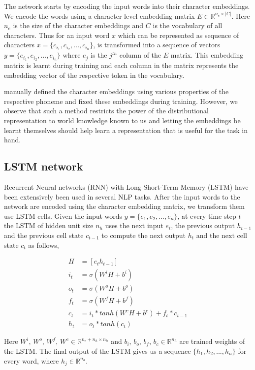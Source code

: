\documentclass[11pt,letterpaper]{article}
\begin{document}
The network starts by encoding the input words into their character embeddings. We encode the words using a character level embedding matrix $E \in \mathbb{R}^{n_e \times |C|}$. Here $n_e$ is the size of the character embeddings and $C$ is the vocabulary of all characters. Thus for an input word $x$ which can be represented as sequence of characters $x = \{c_{i_1}, c_{i_2}, ..., c_{i_n}\}$, is transformed into a sequence of vectors $y = \{e_{i_1}, e_{i_2}, ..., e_{i_n}\}$ where $e_j$ is the $j^{th}$ column of the $E$ matrix. This embedding matrix is learnt during training and each column in the matrix represents the embedding vector of the respective token in the vocabulary. 

\citet{rama2016siamese} manually defined the character embeddings using various properties of the respective phoneme and fixed these embeddings during training. However, we observe that such a method restricts the power of the distributional representation to world knowledge known to us and letting the embeddings be learnt themselves should help learn a representation that is useful for the task in hand.

\subsection{LSTM network}

Recurrent Neural networks (RNN) with Long Short-Term Memory (LSTM) have been extensively been used in several NLP tasks. After the input words to the network are encoded using the character embedding matrix, we transform them use LSTM cells. Given the input words $y = \{e_1, e_2, ..., e_n\}$, at every time step $t$ the LSTM of hidden unit size $n_h$ uses the next input $e_t$, the previous output $h_{t-1}$ and the previous cell state $c_{t-1}$ to compute the next output $h_t$ and the next cell state $c_t$ as follows,

\begin{align}
H &= [e_t h_{t-1}] \\
i_t &= \sigma (W^iH + b^i) \\
o_t &= \sigma (W^oH + b^o) \\
f_t &= \sigma (W^fH + b^f) \\
c_t &= i_t * tanh(W^cH + b^c) + f_t * c_{t-1} \\
h_t &= o_t * tanh(c_t)
\end{align}

Here $W^i$, $W^o$, $W^f$, $W^c \in  \mathbb{R}^{n_e+n_h \times n_h}$ and $b_i$, $b_o$, $b_f$, $b_c \in \mathbb{R}^{n_h}$ are trained weights of the LSTM. The final output of the LSTM gives us a sequence $\{h_1, h_2, ..., h_n\}$ for every word, where $h_j \in \mathbb{R}^{n_h}$.
\end{document}
